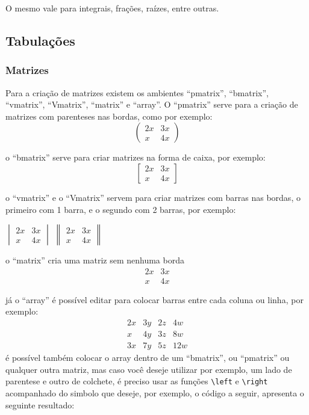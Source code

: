 O mesmo vale para integrais, frações, raízes, entre outras.
\subsection{Tabulações}
\subsubsection{Matrizes}
Para a criação de matrizes existem os ambientes ``pmatrix'', ``bmatrix'', ``vmatrix'', ``Vmatrix'', ``matrix'' e ``array''. O ``pmatrix'' serve para a criação de matrizes com parenteses nas bordas, como por exemplo:
\[
\begin{pmatrix}
	2x & 3x \\ 
	x & 4x
\end{pmatrix} 
\]

o ``bmatrix'' serve para criar matrizes na forma de caixa, por exemplo:
\[
\begin{bmatrix}
2x & 3x \\ 
x & 4x
\end{bmatrix} 
\]

o ``vmatrix'' e o ``Vmatrix'' servem para criar matrizes com barras nas bordas, o primeiro com 1 barra, e o segundo com 2 barras, por exemplo: \\
\begin{center}
$
\begin{vmatrix}
2x & 3x \\ 
x & 4x
\end{vmatrix} 
$
\hspace*{2cm}
$
\begin{Vmatrix}
2x & 3x \\ 
x & 4x
\end{Vmatrix} 
$
\end{center}

o ``matrix'' cria uma matriz sem nenhuma borda
\[
\begin{matrix}
2x & 3x \\ 
x & 4x
\end{matrix}
\]

já o ``array'' é possível editar para colocar barras entre cada coluna ou linha, por exemplo:
\[
\begin{array}{c|ccc}
2x & 3y &2z & 4w\\ 
x & 4y & 3z & 8w \\ \hline
3x & 7y & 5z & 12w
\end{array}
\]
é possível também colocar o array dentro de um ``bmatrix'', ou ``pmatrix'' ou qualquer outra matriz, mas caso você deseje utilizar por exemplo, um lado de parentese e outro de colchete, é preciso usar as funções \lstinline|\left| e \lstinline|\right| acompanhado do simbolo que deseje, por exemplo, o código a seguir, apresenta o seguinte resultado:

